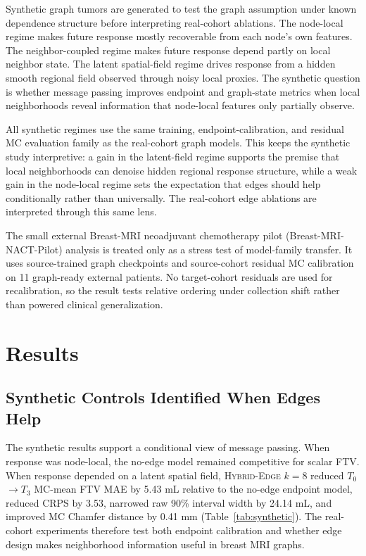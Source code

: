 \documentclass[journal,twoside,print]{ieeecolor}
\newcommand{\Tzero}{\ensuremath{T_0}}
\newcommand{\Tthree}{\ensuremath{T_3}}
\newcommand{\modeltag}{\textsc{Hybrid-Edge} $k=8$}
\begin{document}
Synthetic graph tumors are generated to test the graph assumption under known
dependence structure before interpreting real-cohort ablations. The node-local
regime makes future response mostly recoverable from each node's own features.
The neighbor-coupled regime makes future response depend partly on local
neighbor state. The latent spatial-field regime drives response from a hidden
smooth regional field observed through noisy local proxies. The synthetic
question is whether message passing improves endpoint and graph-state metrics
when local neighborhoods reveal information that node-local features only
partially observe.

All synthetic regimes use the same training, endpoint-calibration, and residual
MC evaluation family as the real-cohort graph models. This keeps the synthetic
study interpretive: a gain in the latent-field regime supports the premise that
local neighborhoods can denoise hidden regional response structure, while a weak
gain in the node-local regime sets the expectation that edges should help
conditionally rather than universally. The real-cohort edge ablations are
interpreted through this same lens.

The small external Breast-MRI neoadjuvant chemotherapy pilot
(Breast-MRI-NACT-Pilot) analysis is treated only as a stress test of
model-family transfer. It uses source-trained graph checkpoints and
source-cohort residual MC calibration on 11 graph-ready external patients. No
target-cohort residuals are used for recalibration, so the result tests relative
ordering under collection shift rather than powered clinical generalization.

\section{Results}
\label{sec:results}

\subsection{Synthetic Controls Identified When Edges Help}

The synthetic results support a conditional view of message passing. When
response was node-local, the no-edge model remained competitive for scalar FTV.
When response depended on a latent spatial field, \modeltag{} reduced
\Tzero$\rightarrow$\Tthree{} MC-mean FTV MAE by 5.43 mL relative to the no-edge
endpoint model, reduced CRPS by 3.53, narrowed raw 90\% interval width by
24.14 mL, and improved MC Chamfer distance by 0.41 mm
(Table~\ref{tab:synthetic}). The real-cohort experiments therefore test both
endpoint calibration and whether edge design makes neighborhood information
useful in breast MRI graphs.
\end{document}
